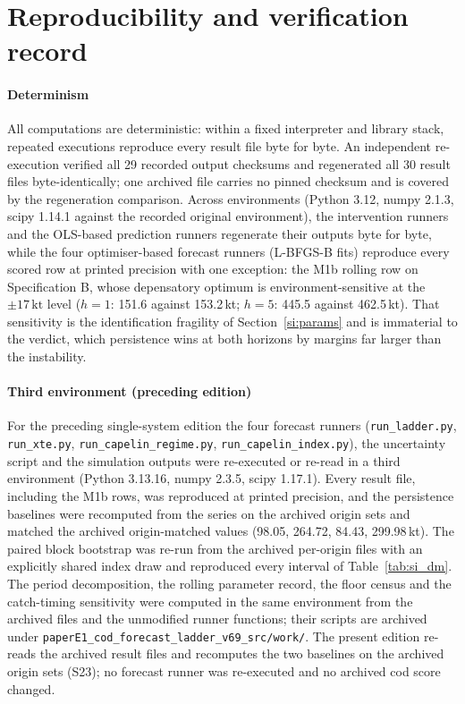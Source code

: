 \documentclass[preprint,11pt,authoryear]{elsarticle}
\theoremstyle{remark}
\newcommand{\kt}{\,\mathrm{kt}}
\begin{document}
\FloatBarrier
\section{Reproducibility and verification record}\label{si:repro}

\paragraph{Determinism} All computations are deterministic: within a fixed interpreter and library stack, repeated executions reproduce every result file byte for byte. An independent re-execution verified all 29 recorded output checksums and regenerated all 30 result files byte-identically; one archived file carries no pinned checksum and is covered by the regeneration comparison. Across environments (Python 3.12, numpy 2.1.3, scipy 1.14.1 against the recorded original environment), the intervention runners and the OLS-based prediction runners regenerate their outputs byte for byte, while the four optimiser-based forecast runners (L-BFGS-B fits) reproduce every scored row at printed precision with one exception: the M1b rolling row on Specification B, whose depensatory optimum is environment-sensitive at the $\pm17\kt$ level ($h=1$: 151.6 against 153.2\,kt; $h=5$: 445.5 against 462.5\,kt). That sensitivity is the identification fragility of Section~\ref{si:params} and is immaterial to the verdict, which persistence wins at both horizons by margins far larger than the instability.

\paragraph{Third environment (preceding edition)} For the preceding single-system edition the four forecast runners (\texttt{run\_ladder.py}, \texttt{run\_xte.py}, \texttt{run\_capelin\_regime.py}, \texttt{run\_capelin\_index.py}), the uncertainty script and the simulation outputs were re-executed or re-read in a third environment (Python 3.13.16, numpy 2.3.5, scipy 1.17.1). Every result file, including the M1b rows, was reproduced at printed precision, and the persistence baselines were recomputed from the series on the archived origin sets and matched the archived origin-matched values (98.05, 264.72, 84.43, 299.98\,kt). The paired block bootstrap was re-run from the archived per-origin files with an explicitly shared index draw and reproduced every interval of Table~\ref{tab:si_dm}. The period decomposition, the rolling parameter record, the floor census and the catch-timing sensitivity were computed in the same environment from the archived files and the unmodified runner functions; their scripts are archived under \texttt{paperE1\_cod\_forecast\_ladder\_v69\_src/work/}. The present edition re-reads the archived result files and recomputes the two baselines on the archived origin sets (S23); no forecast runner was re-executed and no archived cod score changed.
\end{document}
